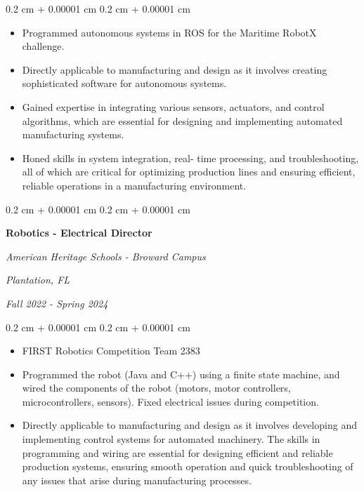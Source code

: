 \documentclass[10pt, letterpaper]{article}
\newenvironment{highlights}{
    \begin{itemize}[
        topsep=0.10 cm,
        parsep=0.10 cm,
        partopsep=0pt,
        itemsep=0pt,
        leftmargin=0.4 cm + 10pt
    ]
}{
    \end{itemize}
} %
\newenvironment{onecolentry}{
    \begin{adjustwidth}{
        0.2 cm + 0.00001 cm
    }{
        0.2 cm + 0.00001 cm
    }
}{
    \end{adjustwidth}
} %
\newenvironment{twocolentry}[2][]{
    \onecolentry
    \def\secondColumn{#2}
    \setcolumnwidth{\fill, 4.5 cm}
    \begin{paracol}{2}
}{
    \switchcolumn \raggedleft \secondColumn
    \end{paracol}
    \endonecolentry
} %
\begin{document}
        \vspace{0.10 cm}
        \begin{onecolentry}
            \begin{highlights}
                \item Programmed autonomous systems in ROS for the Maritime RobotX challenge. 
                \item Directly applicable to manufacturing
                and design as it involves creating sophisticated software for autonomous systems.
                \item Gained expertise in integrating various sensors, actuators, and
                control algorithms, which are essential for designing and implementing automated
                manufacturing systems.
                \item Honed skills in system integration, real-
                time processing, and troubleshooting, all of which are critical for optimizing production
                lines and ensuring efficient, reliable operations in a manufacturing environment.
            \end{highlights}
        \end{onecolentry}


        \vspace{0.2 cm}

        \begin{twocolentry}{
        \textit{Plantation, FL}    
            
        \textit{Fall 2022 - Spring 2024}}
            \textbf{Robotics - Electrical Director}
            
            \textit{American Heritage Schools - Broward Campus}
        \end{twocolentry}

        \vspace{0.10 cm}
        \begin{onecolentry}
            \begin{highlights}
                \item FIRST Robotics Competition Team 2383 
                \item Programmed the robot (Java and C++) using a finite state machine, and wired the components of the robot (motors, motor controllers, microcontrollers, sensors). Fixed electrical issues during competition. 
                \item Directly applicable to manufacturing and design as it
                involves developing and implementing control systems for automated machinery. The
                skills in programming and wiring are essential for designing efficient and reliable
                production systems, ensuring smooth operation and quick troubleshooting of any issues
                that arise during manufacturing processes.
            \end{highlights}
        \end{onecolentry}
\end{document}
